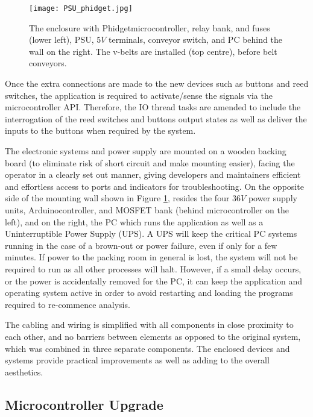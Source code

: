 \documentclass[fleqn,twoside,12pt]{report}
\begin{document}
\begin{figure}[h]
	\centering
	\texttt{[image: PSU\_phidget.jpg]}
	\caption{The enclosure with Phidget\texttrademark microcontroller, relay bank, and fuses (lower left), PSU, $5V$ terminals, conveyor switch, and PC behind the wall on the right. The v-belts are installed (top centre), before belt conveyors.}
	\label{fig:PSU_phidget}
\end{figure}%

Once the extra connections are made to the new devices such as buttons and reed switches, the application is required to activate/sense the signals via the microcontroller API. Therefore, the IO thread tasks are amended to include the interrogation of the reed switches and buttons output states as well as deliver the inputs to the buttons when required by the system. 

The electronic systems and power supply are mounted on a wooden backing board (to eliminate risk of short circuit and make mounting easier), facing the operator in a clearly set out manner, giving developers and maintainers efficient and effortless access to ports and indicators for troubleshooting. On the opposite side of the mounting wall shown in Figure \ref{fig:PSU_phidget}, resides the four $36V$ power supply units, Arduino\texttrademark controller, and MOSFET bank (behind microcontroller on the left), and on the right, the PC which runs the application as well as a Uninterruptible Power Supply (UPS). A UPS will keep the critical PC systems running in the case of a brown-out or power failure, even if only for a few minutes. If power to the packing room in general is lost, the system will not be required to run as all other processes will halt. However, if a small delay occurs, or the power is accidentally removed for the PC, it can keep the application and operating system active in order to avoid restarting and loading the programs required to re-commence analysis.

The cabling and wiring is simplified with all components in close proximity to each other, and no barriers between elements as opposed to the original system, which was combined in three separate components. The enclosed devices and systems provide practical improvements as well as adding to the overall aesthetics. 





\subsection{Microcontroller Upgrade}
\end{document}
